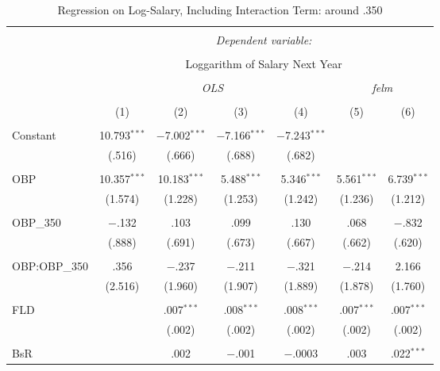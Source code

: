 
\begin{table}[H] \centering
  \caption{Regression on Log-Salary, Including Interaction Term: around .350}
  \label{OBP350_A}
\tiny
\begin{tabular}{@{\extracolsep{5pt}}lcccccc}
\\[-1.8ex]\hline
\hline \\[-1.8ex]
 & \multicolumn{6}{c}{\textit{Dependent variable:}} \\
\cline{2-7}
\\[-1.8ex] & \multicolumn{6}{c}{Loggarithm of Salary Next Year} \\
\\[-1.8ex] & \multicolumn{4}{c}{\textit{OLS}} & \multicolumn{2}{c}{\textit{felm}} \\
\\[-1.8ex] & (1) & (2) & (3) & (4) & (5) & (6)\\
\hline \\[-1.8ex]
 Constant & 10.793$^{***}$ & $-$7.002$^{***}$ & $-$7.166$^{***}$ & $-$7.243$^{***}$ &  &  \\
  & (.516) & (.666) & (.688) & (.682) &  &  \\
  & & & & & & \\
 OBP & 10.357$^{***}$ & 10.183$^{***}$ & 5.488$^{***}$ & 5.346$^{***}$ & 5.561$^{***}$ & 6.739$^{***}$ \\
  & (1.574) & (1.228) & (1.253) & (1.242) & (1.236) & (1.212) \\
  & & & & & & \\
 OBP\_350 & $-$.132 & .103 & .099 & .130 & .068 & $-$.832 \\
  & (.888) & (.691) & (.673) & (.667) & (.662) & (.620) \\
  & & & & & & \\
  OBP:OBP\_350 & .356 & $-$.237 & $-$.211 & $-$.321 & $-$.214 & 2.166 \\
  & (2.516) & (1.960) & (1.907) & (1.889) & (1.878) & (1.760) \\
  & & & & & & \\
 FLD &  & .007$^{***}$ & .008$^{***}$ & .008$^{***}$ & .007$^{***}$ & .007$^{***}$ \\
  &  & (.002) & (.002) & (.002) & (.002) & (.002) \\
  & & & & & & \\
 BsR &  & .002 & $-$.001 & $-$.0003 & .003 & .022$^{***}$ \\

\end{tabular}
\end{table}
